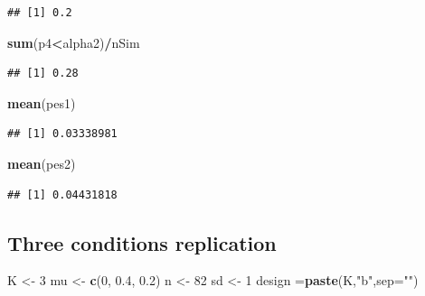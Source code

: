 \documentclass[]{book}
\newenvironment{Shaded}{\begin{snugshade}}{\end{snugshade}}
\newcommand{\DataTypeTok}[1]{\textcolor[rgb]{0.13,0.29,0.53}{#1}}
\newcommand{\DecValTok}[1]{\textcolor[rgb]{0.00,0.00,0.81}{#1}}
\newcommand{\FloatTok}[1]{\textcolor[rgb]{0.00,0.00,0.81}{#1}}
\newcommand{\KeywordTok}[1]{\textcolor[rgb]{0.13,0.29,0.53}{\textbf{#1}}}
\newcommand{\NormalTok}[1]{#1}
\newcommand{\OperatorTok}[1]{\textcolor[rgb]{0.81,0.36,0.00}{\textbf{#1}}}
\newcommand{\StringTok}[1]{\textcolor[rgb]{0.31,0.60,0.02}{#1}}
\begin{document}
\begin{verbatim}
## [1] 0.2
\end{verbatim}

\begin{Shaded}
\begin{Highlighting}[]
\KeywordTok{sum}\NormalTok{(p4}\OperatorTok{<}\NormalTok{alpha2)}\OperatorTok{/}\NormalTok{nSim}
\end{Highlighting}
\end{Shaded}

\begin{verbatim}
## [1] 0.28
\end{verbatim}

\begin{Shaded}
\begin{Highlighting}[]
\KeywordTok{mean}\NormalTok{(pes1)}
\end{Highlighting}
\end{Shaded}

\begin{verbatim}
## [1] 0.03338981
\end{verbatim}

\begin{Shaded}
\begin{Highlighting}[]
\KeywordTok{mean}\NormalTok{(pes2)}
\end{Highlighting}
\end{Shaded}

\begin{verbatim}
## [1] 0.04431818
\end{verbatim}

\hypertarget{three-conditions-replication-2}{%
\subsection{Three conditions replication}\label{three-conditions-replication-2}}

\begin{Shaded}
\begin{Highlighting}[]
\NormalTok{K <-}\StringTok{ }\DecValTok{3}
\NormalTok{mu <-}\StringTok{ }\KeywordTok{c}\NormalTok{(}\DecValTok{0}\NormalTok{, }\FloatTok{0.4}\NormalTok{, }\FloatTok{0.2}\NormalTok{)}
\NormalTok{n <-}\StringTok{ }\DecValTok{82}
\NormalTok{sd <-}\StringTok{ }\DecValTok{1}
\NormalTok{design =}\KeywordTok{paste}\NormalTok{(K,}\StringTok{"b"}\NormalTok{,}\DataTypeTok{sep=}\StringTok{""}\NormalTok{)}
\end{Highlighting}
\end{Shaded}
\end{document}
